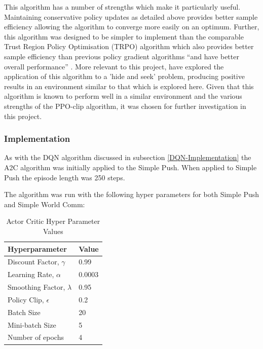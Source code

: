 \documentclass{article}
\begin{document}
This algorithm has a number of strengths which make it particularly useful.
Maintaining conservative policy updates as detailed above provides better sample efficiency allowing the algorithm to converge more easily on an optimum.
Further, this algorithm was designed to be simpler to implement than the comparable Trust Region Policy Optimisation (TRPO) algorithm \citet{trustregionpolicy} which also provides better sample efficiency than previous policy gradient algorithms “and have better overall performance” \citet{PPOAlgo}.
More relevant to this project, \citet{emergenttoolusage} have explored the application of this algorithm to a 'hide and seek' problem, producing positive results in an environment similar to that which is explored here.
Given that this algorithm is known to perform well in a similar environment and the various strengths of the PPO-clip algorithm, it was chosen for further investigation in this project.

\subsubsection{Implementation} \label{A2C-Implementation}

As with the DQN algorithm discussed in subsection \ref{DQN-Implementation} the A2C algorithm was initially applied to the Simple Push.
When applied to Simple Push the episode length was 250 steps.

The algorithm was run with the following hyper parameters for both Simple Push and Simple World Comm:

\begin{table}[!ht]
  \centering
  \begin{tabular}{|l|l|}
    \hline
  \textbf{Hyperparameter}             & \textbf{Value}  \\ \hline
  Discount Factor, $\gamma$           & 0.99            \\ \hline
  Learning Rate, $\alpha$             & 0.0003          \\ \hline
  Smoothing Factor, $\lambda$         & 0.95            \\ \hline
  Policy Clip, $\epsilon$             & 0.2             \\ \hline
  Batch Size                          & 20              \\ \hline
  Mini-batch Size                     & 5               \\ \hline
  Number of epochs                    & 4               \\ \hline
  \end{tabular}
  \caption{Actor Critic Hyper Parameter Values}
\end{table}
\end{document}
